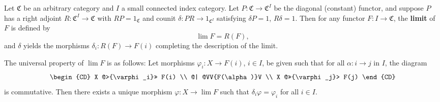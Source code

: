 Let $\mathfrak{C}$ be an arbitrary category and $I$ a small connected index category. Let $P : \mathfrak{C} \rightarrow \mathfrak{C}^I$ be the diagonal (constant) functor, and suppose $P$ has a right adjoint $R : \mathfrak{C}^I \rightarrow \mathfrak{C}$ with $RP = 1_{\mathfrak{C}}$ and counit $\delta : PR \rightarrow 1_{\mathfrak{C}^I}$ satisfying $\delta P = 1$, $R\delta = 1$. Then for any functor $F : I \rightarrow \mathfrak{C}$, the \textbf{limit} of $F$ is defined by
$$
\lim F = R(F),
$$
and $\delta$ yields the morphisms $\delta_i : R(F) \rightarrow F(i)$ completing the description of the limit.

The universal property of $\lim F$ is as follows: Let morphisms $\varphi_i : X \rightarrow F(i)$, $i \in I$, be given such that for all $\alpha : i \rightarrow j$ in $I$, the diagram
$$
\begin{CD}
X @>{\varphi_i}>> F(i) \\
@| @VV{F(\alpha)}V \\
X @>>{\varphi_j}> F(j)
\end{CD}
$$
is commutative. Then there exists a unique morphism $\varphi : X \rightarrow \lim F$ such that $\delta_i \varphi = \varphi_i$ for all $i \in I$.
